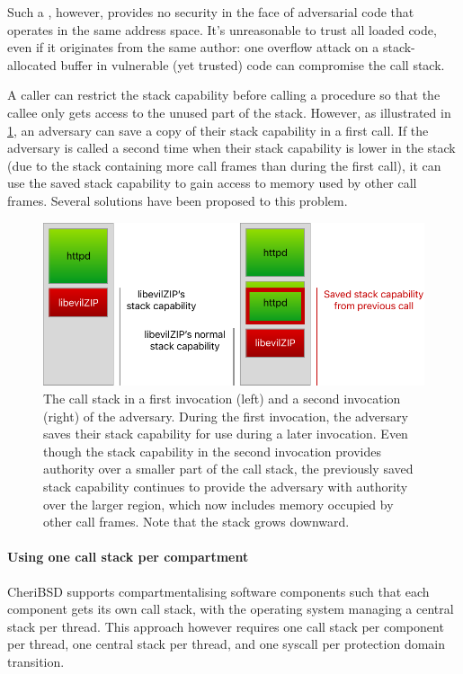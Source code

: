 \documentclass[main.tex]{subfiles}
\begin{document}
Such a \cc{}, however, provides no security in the face of adversarial code that operates in the same address space. It's unreasonable to trust all loaded code, even if it originates from the same author: one overflow attack on a stack-allocated buffer in vulnerable (yet trusted) code can compromise the call stack.


A caller can restrict the stack capability before calling a procedure so that the callee only gets access to the unused part of the stack. However, as illustrated in \cref{fig:savedstackcap}, an adversary can save a copy of their stack capability in a first call. If the adversary is called a second time when their stack capability is lower in the stack (due to the stack containing more call frames than during the first call), it can use the saved stack capability to gain access to memory used by other call frames. Several solutions have been proposed to this problem.

\begin{figure}
	\begin{center}
		\includegraphics{Images/Saved Stack Cap.pdf}
	\end{center}
	\caption{The call stack in a first invocation (left) and a second invocation (right) of the adversary. During the first invocation, the adversary saves their stack capability for use during a later invocation. Even though the stack capability in the second invocation provides authority over a smaller part of the call stack, the previously saved stack capability continues to provide the adversary with authority over the larger region, which now includes memory occupied by other call frames. Note that the stack grows downward.}
	\label{fig:savedstackcap}
\end{figure}

\paragraph{Using one call stack per compartment} CheriBSD supports compartmentalising software components such that each component gets its own call stack, with the operating system managing a central stack per thread. This approach however requires one call stack per component per thread, one central stack per thread, and one syscall per protection domain transition.\cite{compartment}
\end{document}
